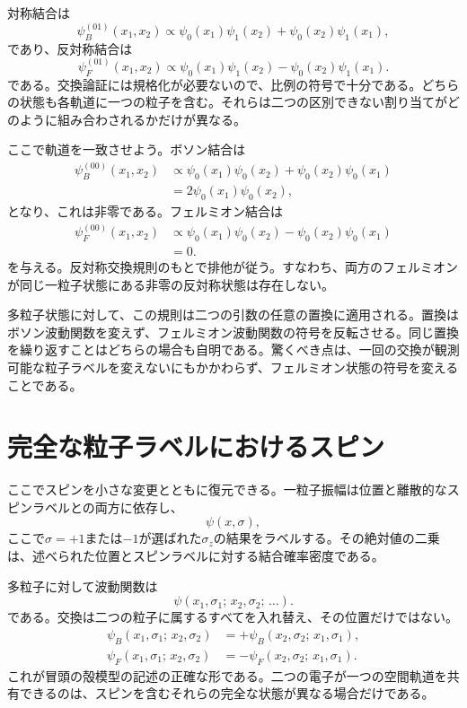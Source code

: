 対称結合は
\begin{equation}
\psi_B^{(01)}(x_1,x_2)
\propto
\psi_0(x_1)\psi_1(x_2)
+
\psi_0(x_2)\psi_1(x_1),
\end{equation}
であり、反対称結合は
\begin{equation}
\psi_F^{(01)}(x_1,x_2)
\propto
\psi_0(x_1)\psi_1(x_2)
-
\psi_0(x_2)\psi_1(x_1).
\end{equation}
である。交換論証には規格化が必要ないので、比例の符号で十分である。どちらの状態も各軌道に一つの粒子を含む。それらは二つの区別できない割り当てがどのように組み合わされるかだけが異なる。

ここで軌道を一致させよう。ボソン結合は
\begin{align}
\psi_B^{(00)}(x_1,x_2)
&\propto
\psi_0(x_1)\psi_0(x_2)
+
\psi_0(x_2)\psi_0(x_1)\\
&=
2\psi_0(x_1)\psi_0(x_2),
\end{align}
となり、これは非零である。フェルミオン結合は
\begin{align}
\psi_F^{(00)}(x_1,x_2)
&\propto
\psi_0(x_1)\psi_0(x_2)
-
\psi_0(x_2)\psi_0(x_1)\\
&=0.
\end{align}
を与える。反対称交換規則のもとで排他が従う。すなわち、両方のフェルミオンが同じ一粒子状態にある非零の反対称状態は存在しない。

多粒子状態に対して、この規則は二つの引数の任意の置換に適用される。置換はボソン波動関数を変えず、フェルミオン波動関数の符号を反転させる。同じ置換を繰り返すことはどちらの場合も自明である。驚くべき点は、一回の交換が観測可能な粒子ラベルを変えないにもかかわらず、フェルミオン状態の符号を変えることである。

\section{完全な粒子ラベルにおけるスピン}

ここでスピンを小さな変更とともに復元できる。一粒子振幅は位置と離散的なスピンラベルとの両方に依存し、
\begin{equation}
\psi(x,\sigma),
\end{equation}
ここで\(\sigma=+1\)または\(-1\)が選ばれた\(\sigma_z\)の結果をラベルする。その絶対値の二乗は、述べられた位置とスピンラベルに対する結合確率密度である。

多粒子に対して波動関数は
\begin{equation}
\psi(x_1,\sigma_1;\,x_2,\sigma_2;\,\ldots).
\end{equation}
である。交換は二つの粒子に属するすべてを入れ替え、その位置だけではない。
\begin{align}
\psi_B(x_1,\sigma_1;\,x_2,\sigma_2)
&=
+\psi_B(x_2,\sigma_2;\,x_1,\sigma_1),\\
\psi_F(x_1,\sigma_1;\,x_2,\sigma_2)
&=
-\psi_F(x_2,\sigma_2;\,x_1,\sigma_1).
\end{align}
これが冒頭の殻模型の記述の正確な形である。二つの電子が一つの空間軌道を共有できるのは、スピンを含むそれらの完全な状態が異なる場合だけである。

